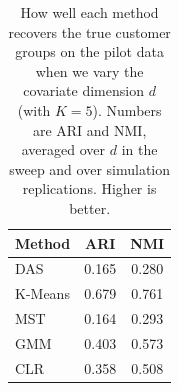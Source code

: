 \begin{table}[htbp]
\centering
\caption{How well each method recovers the true customer groups on the pilot data when we vary the covariate dimension $d$ (with $K=5$). Numbers are ARI and NMI, averaged over $d$ in the sweep and over simulation replications. Higher is better.}
\label{tab:app-ari-nmi-varying-d-avg}
\begin{tabular}{lcc}
\toprule
Method & ARI & NMI \\
\midrule
DAS & 0.165 & 0.280 \\
K-Means & 0.679 & 0.761 \\
MST & 0.164 & 0.293 \\
GMM & 0.403 & 0.573 \\
CLR & 0.358 & 0.508 \\
\bottomrule
\end{tabular}
\end{table}
